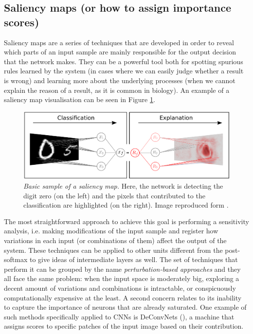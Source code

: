 \subsection{Saliency maps (or how to assign importance scores)}

Saliency maps are a series of techniques that are developed in order to reveal which parts of an input sample are mainly responsible for the output decision that the network makes. They can be a powerful tool both for spotting spurious rules learned by the system (in cases where we can easily judge whether a result is wrong) and learning more about the underlying processes (when we cannot explain the reason of a result, as it is common in biology). An example of a saliency map visualisation can be seen in Figure \ref{fig:deeptaylor}.

\begin{figure}
	\centering
	\includegraphics[width=0.7\linewidth]{Figures/deeptaylor}
	\caption{\textit{Basic sample of a saliency map.} Here, the network is detecting the digit zero (on the left) and the pixels that contributed to the classification are highlighted (on the right). Image reproduced form \cite{Montavon2017}.}
	\label{fig:deeptaylor}
\end{figure}


The most straightforward approach to achieve this goal is performing a sensitivity analysis, i.e. making modifications of the input sample and register how variations in each input (or combinations of them) affect the output of the system. These techniques can be applied to other units different from the post-softmax to give ideas of intermediate layers as well. The set of techniques that perform it can be grouped by the name \textit{perturbation-based approaches} and they all face the same problem: when the input space is moderately big, exploring a decent amount of variations and combinations is intractable, or conspicuously computationally expensive at the least. A second concern relates to its inability to capture the importance of neurons that are already saturated. One example of such methods specifically applied to CNNs is DeConvNets (\cite{Zeiler2014}), a machine that assigns scores to specific patches of the input image based on their contribution.


